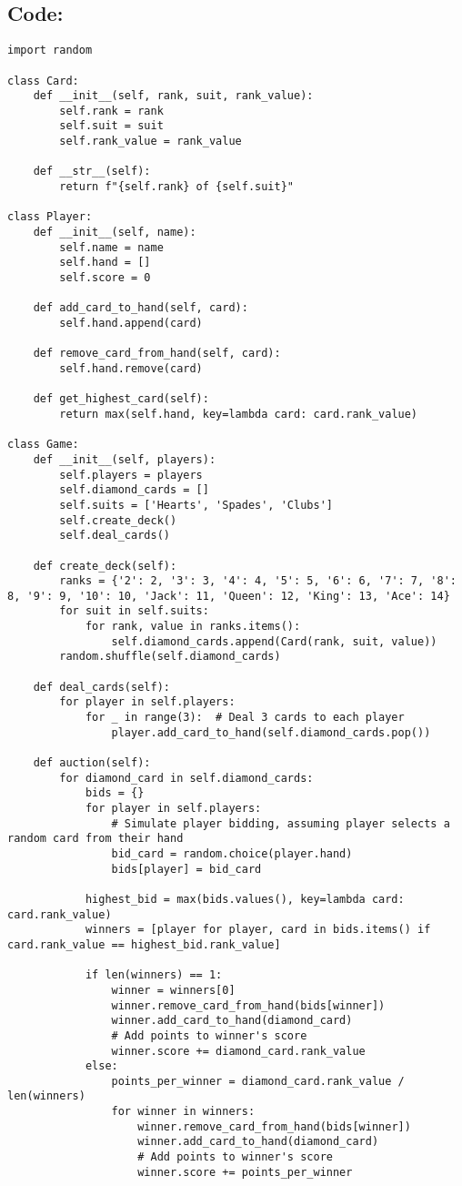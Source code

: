 \documentclass{article}
\begin{document}
\subsection*{Code:}
\begin{verbatim}
import random

class Card:
    def __init__(self, rank, suit, rank_value):
        self.rank = rank
        self.suit = suit
        self.rank_value = rank_value

    def __str__(self):
        return f"{self.rank} of {self.suit}"

class Player:
    def __init__(self, name):
        self.name = name
        self.hand = []
        self.score = 0

    def add_card_to_hand(self, card):
        self.hand.append(card)

    def remove_card_from_hand(self, card):
        self.hand.remove(card)

    def get_highest_card(self):
        return max(self.hand, key=lambda card: card.rank_value)

class Game:
    def __init__(self, players):
        self.players = players
        self.diamond_cards = []
        self.suits = ['Hearts', 'Spades', 'Clubs']
        self.create_deck()
        self.deal_cards()

    def create_deck(self):
        ranks = {'2': 2, '3': 3, '4': 4, '5': 5, '6': 6, '7': 7, '8': 8, '9': 9, '10': 10, 'Jack': 11, 'Queen': 12, 'King': 13, 'Ace': 14}
        for suit in self.suits:
            for rank, value in ranks.items():
                self.diamond_cards.append(Card(rank, suit, value))
        random.shuffle(self.diamond_cards)

    def deal_cards(self):
        for player in self.players:
            for _ in range(3):  # Deal 3 cards to each player
                player.add_card_to_hand(self.diamond_cards.pop())

    def auction(self):
        for diamond_card in self.diamond_cards:
            bids = {}
            for player in self.players:
                # Simulate player bidding, assuming player selects a random card from their hand
                bid_card = random.choice(player.hand)
                bids[player] = bid_card

            highest_bid = max(bids.values(), key=lambda card: card.rank_value)
            winners = [player for player, card in bids.items() if card.rank_value == highest_bid.rank_value]

            if len(winners) == 1:
                winner = winners[0]
                winner.remove_card_from_hand(bids[winner])
                winner.add_card_to_hand(diamond_card)
                # Add points to winner's score
                winner.score += diamond_card.rank_value
            else:
                points_per_winner = diamond_card.rank_value / len(winners)
                for winner in winners:
                    winner.remove_card_from_hand(bids[winner])
                    winner.add_card_to_hand(diamond_card)
                    # Add points to winner's score
                    winner.score += points_per_winner


\end{verbatim}
\end{document}
